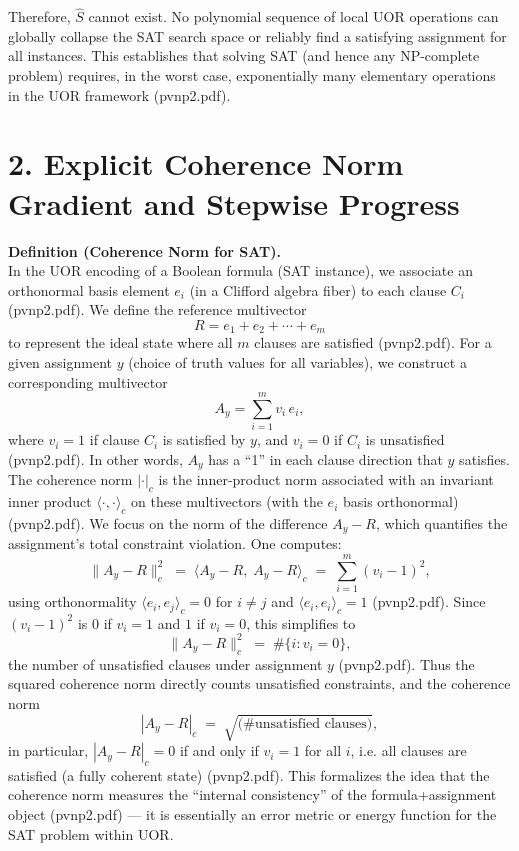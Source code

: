 \documentclass[11pt]{article}
\begin{document}
Therefore, \(\hat S\) cannot exist. No polynomial sequence of local UOR operations can globally collapse the SAT search space or reliably find a satisfying assignment for all instances. This establishes that solving SAT (and hence any NP-complete problem) requires, in the worst case, exponentially many elementary operations in the UOR framework (pvnp2.pdf).

\vspace{1em}

\section*{2. Explicit Coherence Norm Gradient and Stepwise Progress}

\textbf{Definition (Coherence Norm for SAT).} \\
In the UOR encoding of a Boolean formula (SAT instance), we associate an orthonormal basis element \(e_i\) (in a Clifford algebra fiber) to each clause \(C_i\) (pvnp2.pdf). We define the reference multivector 
\[
R = e_1 + e_2 + \cdots + e_m
\]
to represent the ideal state where all \(m\) clauses are satisfied (pvnp2.pdf). For a given assignment \(y\) (choice of truth values for all variables), we construct a corresponding multivector
\[
A_y = \sum_{i=1}^m v_i\, e_i,
\]
where \(v_i = 1\) if clause \(C_i\) is satisfied by \(y\), and \(v_i = 0\) if \(C_i\) is unsatisfied (pvnp2.pdf). In other words, \(A_y\) has a “1” in each clause direction that \(y\) satisfies. The coherence norm \(|\cdot|_c\) is the inner-product norm associated with an invariant inner product \(\langle\cdot,\cdot\rangle_c\) on these multivectors (with the \(e_i\) basis orthonormal) (pvnp2.pdf). We focus on the norm of the difference \(A_y - R\), which quantifies the assignment’s total constraint violation. One computes:
\[
\|A_y - R\|_c^2 \;=\; \langle A_y - R,\; A_y - R \rangle_c \;=\; \sum_{i=1}^m (v_i - 1)^2,
\]
using orthonormality \(\langle e_i, e_j\rangle_c = 0\) for \(i\neq j\) and \(\langle e_i,e_i\rangle_c=1\) (pvnp2.pdf). Since \((v_i-1)^2\) is \(0\) if \(v_i=1\) and \(1\) if \(v_i=0\), this simplifies to
\[
\|A_y - R\|_c^2 \;=\; \#\{i : v_i = 0\},
\]
the number of unsatisfied clauses under assignment \(y\) (pvnp2.pdf). Thus the squared coherence norm directly counts unsatisfied constraints, and the coherence norm 
\[
|A_y - R|_c \;=\; \sqrt{\text{(\# unsatisfied clauses)}},
\]
in particular, \(|A_y - R|_c = 0\) if and only if \(v_i=1\) for all \(i\), i.e. all clauses are satisfied (a fully coherent state) (pvnp2.pdf). This formalizes the idea that the coherence norm measures the “internal consistency” of the formula+assignment object (pvnp2.pdf) --- it is essentially an error metric or energy function for the SAT problem within UOR.
\end{document}
